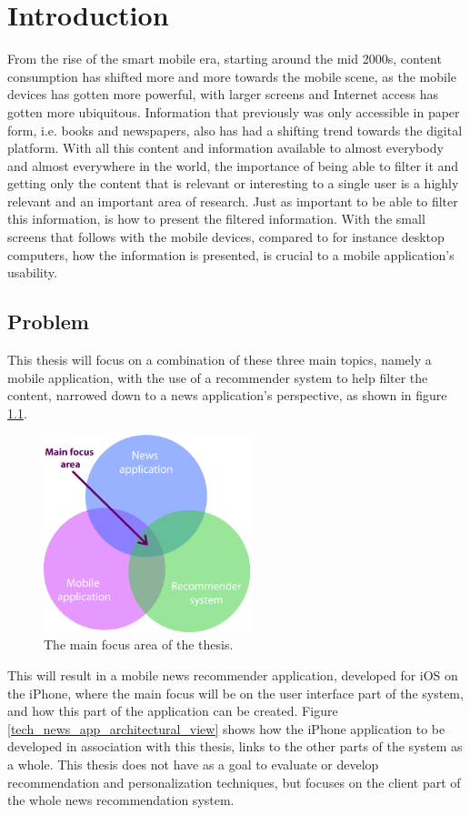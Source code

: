 \chapter{Introduction}
From the rise of the smart mobile era, starting around the mid 2000s, content consumption has shifted more and more towards the mobile scene, as the mobile devices has gotten more powerful, with larger screens and Internet access has gotten more ubiquitous. Information that previously was only accessible in paper form, i.e. books and newspapers, also has had a shifting trend towards the digital platform. With all this content and information available to almost everybody and almost everywhere in the world, the importance of being able to filter it and getting only the content that is relevant or interesting to a single user is a highly relevant and an important area of research. Just as important to be able to filter this information, is how to present the filtered information. With the small screens that follows with the mobile devices, compared to for instance desktop computers, how the information is presented, is crucial to a mobile application's usability.

\section{Problem}
This thesis will focus on a combination of these three main topics, namely a mobile application, with the use of a recommender system to help filter the content, narrowed down to a news application's perspective, as shown in figure \ref{thesis_focus_area}.

\begin{figure}[!htbp]
\centering
\includegraphics[width=60mm]{GFX/figures/thesisFocusArea.png}
\caption{The main focus area of the thesis.}
\label{thesis_focus_area}
\end{figure}

This will result in a mobile news recommender application, developed for iOS on the iPhone, where the main focus will be on the user interface part of the system, and how this part of the application can be created. Figure \ref{tech_news_app_architectural_view} shows how the iPhone application to be developed in association with this thesis, links to the other parts of the system as a whole. This thesis does not have as a goal to evaluate or develop recommendation and personalization techniques, but focuses on the client part of the whole news recommendation system.

